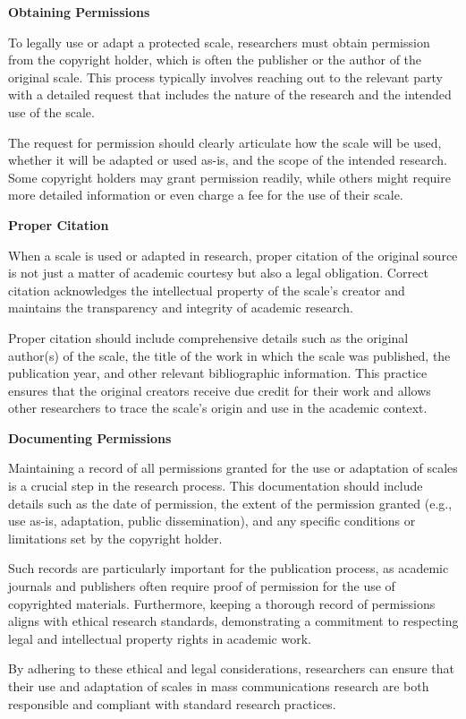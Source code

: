 \documentclass[
]{book}
\begin{document}
\textbf{Obtaining Permissions}

To legally use or adapt a protected scale, researchers must obtain permission from the copyright holder, which is often the publisher or the author of the original scale. This process typically involves reaching out to the relevant party with a detailed request that includes the nature of the research and the intended use of the scale.

The request for permission should clearly articulate how the scale will be used, whether it will be adapted or used as-is, and the scope of the intended research. Some copyright holders may grant permission readily, while others might require more detailed information or even charge a fee for the use of their scale.

\textbf{Proper Citation}

When a scale is used or adapted in research, proper citation of the original source is not just a matter of academic courtesy but also a legal obligation. Correct citation acknowledges the intellectual property of the scale's creator and maintains the transparency and integrity of academic research.

Proper citation should include comprehensive details such as the original author(s) of the scale, the title of the work in which the scale was published, the publication year, and other relevant bibliographic information. This practice ensures that the original creators receive due credit for their work and allows other researchers to trace the scale's origin and use in the academic context.

\textbf{Documenting Permissions}

Maintaining a record of all permissions granted for the use or adaptation of scales is a crucial step in the research process. This documentation should include details such as the date of permission, the extent of the permission granted (e.g., use as-is, adaptation, public dissemination), and any specific conditions or limitations set by the copyright holder.

Such records are particularly important for the publication process, as academic journals and publishers often require proof of permission for the use of copyrighted materials. Furthermore, keeping a thorough record of permissions aligns with ethical research standards, demonstrating a commitment to respecting legal and intellectual property rights in academic work.

By adhering to these ethical and legal considerations, researchers can ensure that their use and adaptation of scales in mass communications research are both responsible and compliant with standard research practices.
\end{document}
